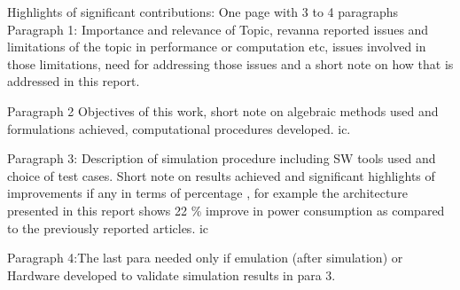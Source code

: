 \vspace{-1cm}


Highlights of significant contributions: One page with 3 to 4 paragraphs\\

Paragraph 1: Importance and relevance of Topic, revanna reported issues and limitations of the topic in performance or computation etc, issues involved in those limitations, need for addressing those issues and a short note on how that is addressed in this report.


Paragraph 2 Objectives of this work, short note on algebraic methods used and formulations achieved, computational procedures developed. \gls{ic}.


Paragraph 3: Description of simulation procedure including SW tools used and choice of test cases. Short note on results achieved and significant highlights of improvements if any in terms of percentage , for example the architecture presented in this report shows 22 \% improve in power consumption as compared to the previously reported articles.
\gls{ic}

Paragraph 4:The last para needed only if emulation (after simulation) or Hardware developed to validate simulation results in para 3. 

\pagebreak
